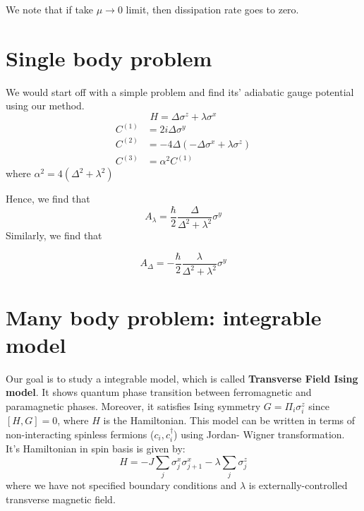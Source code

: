 \documentclass[11pt,a4paper]{article}
\begin{document}
We note that if take $\mu \rightarrow 0$ limit, then dissipation rate goes to zero.



\section{Single body problem}
We would start off with a simple problem and find its' adiabatic gauge potential using our method.
\begin{equation}
H= \Delta \sigma^z + \lambda \sigma^x
\end{equation}
\begin{align}
C^{(1)} &= 2 i \Delta \sigma^y \\
C^{(2)} &= - 4  \Delta ( -  \Delta \sigma^x + \lambda \sigma^z) \\
C^{(3)} &= \alpha^2 C^{(1)} 
\end{align}
where $\alpha^2 = 4 (\Delta^2 + \lambda^2) $

Hence, we find that 
\begin{equation}
A_{\lambda}= \dfrac{\hbar}{2}\dfrac{\Delta }{\Delta^2 + \lambda^2} \sigma^y
\end{equation}
Similarly, we find that 

\begin{equation}
A_{\Delta}= -\dfrac{\hbar}{2}\dfrac{\lambda }{\Delta^2 + \lambda^2} \sigma^y
\end{equation}


\section{Many body problem: integrable model}
Our goal is to study a integrable model, which is called \textbf{Transverse Field Ising model}. It shows quantum phase transition between ferromagnetic and paramagnetic phases. Moreover, it satisfies Ising symmetry $G= \Pi_i \sigma_i^z$ since $[H, G]=0$, where $H$ is the Hamiltonian.
This model can be written in terms of non-interacting spinless fermions ($c_i, c^{\dagger}_i $) using Jordan- Wigner transformation. It's Hamiltonian in spin basis is given by:
\begin{equation}
H= -J \sum_{j} \sigma_j^x \sigma_{j+1}^x - \lambda \sum_{j} \sigma_j^z 
\label{xx_z}
\end{equation}
where we have not specified boundary conditions and $\lambda$ is externally-controlled transverse magnetic field.
\end{document}
